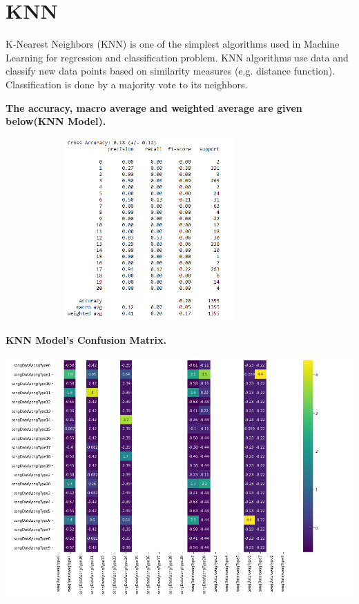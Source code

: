 \documentclass[11pt]{article}
\begin{document}
\section{KNN}
K-Nearest Neighbors (KNN) is one of the simplest algorithms used in Machine Learning for regression and classification problem. KNN algorithms use data and classify new data points based on similarity measures (e.g. distance function). Classification is done by a majority vote to its neighbors.

\begin{center}
\bf The accuracy, macro average and weighted average are given below(KNN Model).
\end{center}

\includegraphics[width=11cm, height=7cm]{KNNModel}

\begin{center}
\bf KNN Model's Confusion Matrix.
\end{center}

\includegraphics[scale=.6]{KNNMatrix}
\end{document}
